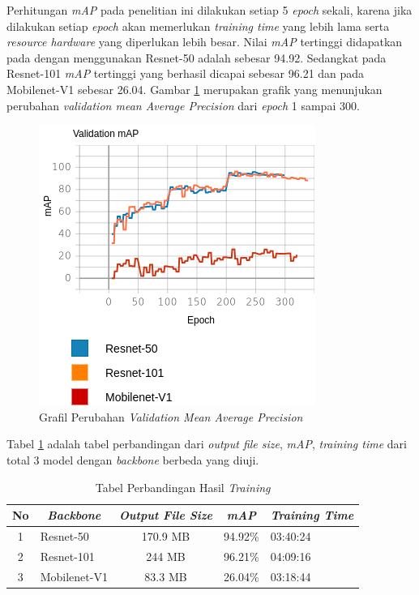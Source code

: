 \documentclass[conference]{IEEEtran}
\begin{document}
	Perhitungan \textit{mAP} pada penelitian ini dilakukan setiap 5 \textit{epoch} sekali, karena jika dilakukan setiap \textit{epoch} akan memerlukan \textit{training time} yang lebih lama serta \textit{resource hardware} yang diperlukan lebih besar. Nilai \textit{mAP} tertinggi didapatkan pada dengan menggunakan Resnet-50 adalah sebesar 94.92. Sedangkat pada Resnet-101 \textit{mAP} tertinggi yang berhasil dicapai sebesar 96.21 dan pada Mobilenet-V1 sebesar 26.04. Gambar \ref{map-result} merupakan grafik yang menunjukan perubahan \textit{validation mean Average Precision} dari \textit{epoch} 1 sampai 300.
	
	\begin{figure}[h]
		\centering
		\includegraphics[scale=0.4]{img/map-result.png}
		\caption{Grafil Perubahan \textit{Validation Mean Average Precision}}
		\label{map-result}
	\end{figure}

	Tabel \ref{tab:training-result} adalah tabel perbandingan dari \textit{output file size}, \textit{mAP}, \textit{training time} dari total 3 model dengan \textit{backbone} berbeda yang diuji. 
	
	\begin{table}[h]
		\begin{tabular}{|c|l|c|c|l|}
			\hline
			\textbf{No} & \multicolumn{1}{c|}{\textit{\textbf{Backbone}}} & \textit{\textbf{Output File Size}} & \textit{\textbf{mAP}} & \multicolumn{1}{c|}{\textit{\textbf{Training Time}}} \\ \hline
			1           & Resnet-50                                       & 170.9 MB                                   & 94.92\%                      & 03:40:24                              \\ \hline
			2           & Resnet-101                                      & 244 MB                                    & 96.21\%                      & 04:09:16                                \\ \hline
			3           & Mobilenet-V1                                    & 83.3 MB                                    & 26.04\%                      & 03:18:44                              \\ \hline
		\end{tabular}
		\caption{Tabel Perbandingan Hasil \textit{Training}}
		\label{tab:training-result}
	\end{table}
	
\end{document}
